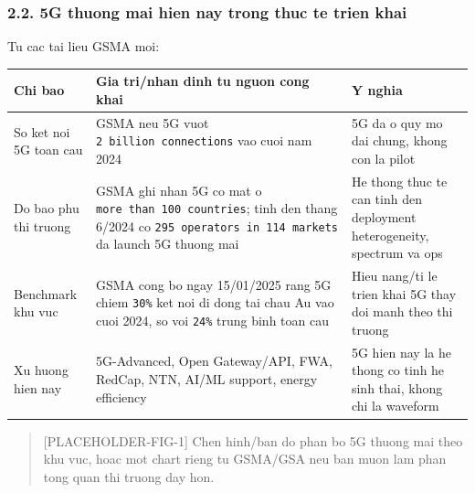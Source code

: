 \documentclass[
  vietnamese,
  a4paper,
  11pt]{article}
\newcounter{none} %
\begin{document}
\subsubsection{2.2. 5G thuong mai hien nay trong thuc te trien
khai}\label{g-thuong-mai-hien-nay-trong-thuc-te-trien-khai}

Tu cac tai lieu GSMA moi:

{\def\LTcaptype{none} %
\begin{longtable}[]{@{}
  >{\raggedright\arraybackslash}p{}
  >{\raggedright\arraybackslash}p{}
  >{\raggedright\arraybackslash}p{}@{}}
\toprule\noalign{}
\begin{minipage}[b]{\linewidth}\raggedright
Chi bao
\end{minipage} & \begin{minipage}[b]{\linewidth}\raggedright
Gia tri/nhan dinh tu nguon cong khai
\end{minipage} & \begin{minipage}[b]{\linewidth}\raggedright
Y nghia
\end{minipage} \\
\midrule\noalign{}
\endhead
\bottomrule\noalign{}
\endlastfoot
So ket noi 5G toan cau & GSMA neu 5G vuot
\texttt{2\ billion\ connections} vao cuoi nam 2024 & 5G da o quy mo dai
chung, khong con la pilot \\
Do bao phu thi truong & GSMA ghi nhan 5G co mat o
\texttt{more\ than\ 100\ countries}; tinh den thang 6/2024 co
\texttt{295\ operators\ in\ 114\ markets} da launch 5G thuong mai & He
thong thuc te can tinh den deployment heterogeneity, spectrum va ops \\
Benchmark khu vuc & GSMA cong bo ngay 15/01/2025 rang 5G chiem
\texttt{30\%} ket noi di dong tai chau Au vao cuoi 2024, so voi
\texttt{24\%} trung binh toan cau & Hieu nang/ti le trien khai 5G thay
doi manh theo thi truong \\
Xu huong hien nay & 5G-Advanced, Open Gateway/API, FWA, RedCap, NTN,
AI/ML support, energy efficiency & 5G hien nay la he thong co tinh he
sinh thai, khong chi la waveform \\
\end{longtable}
}

\begin{quote}
{[}PLACEHOLDER-FIG-1{]} Chen hinh/ban do phan bo 5G thuong mai theo khu
vuc, hoac mot chart rieng tu GSMA/GSA neu ban muon lam phan tong quan
thi truong day hon.
\end{quote}
\end{document}
